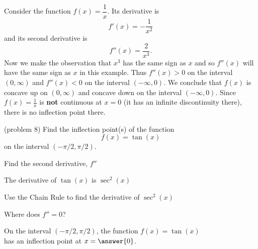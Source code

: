 \documentclass[handout]{ximera}
\begin{document}
\begin{example}[example 8]
Consider the function $f(x) = \dfrac{1}{x}.$ Its derivative is 
\[
f'(x) = -\frac{1}{x^2}
\]
and its second derivative is
\[
f''(x) = \frac{2}{x^3}.
\]
Now we make the observation that $x^3$ has the same sign as $x$ and so $f''(x)$ will have the same sign as $x$
in this example. Thus $f''(x) > 0$ on the interval $(0, \infty)$ and $f''(x) < 0$ on the interval $(-\infty,0).$
We conclude that $f(x)$ is concave up on $(0, \infty)$ and concave down on the interval $(-\infty, 0).$ 
Since $f(x) = \frac{1}{x}$ is \textbf{not} continuous at $x=0$ (it has an infinite discontinuity there), 
there is no inflection point there.  

\end{example}


\begin{problem}(problem 8)
  Find the inflection point(s) of the function
  \[
     f(x) = \tan(x)
  \]
	on the interval $(-\pi/2, \pi/2)$.\\
  
    \begin{hint}
      Find the second derivative, $f''$
    \end{hint}
    \begin{hint}
      The derivative of $\tan(x)$ is $\sec^2(x)$
    \end{hint}
		\begin{hint}
      Use the Chain Rule to find the derivative of $\sec^2(x)$
    \end{hint}
		\begin{hint}
      Where does $f'' = 0$?
    \end{hint}
	On the interval $(-\pi/2, \pi/2)$, the function $f(x) = \tan(x)$ \\
	has an inflection point at $x =\answer{0}$.
 
\end{problem}
\end{document}
